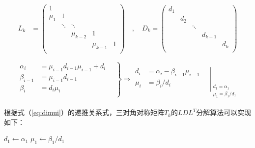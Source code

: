 \documentclass[UTF8,nofonts]{ctexart}
\begin{document}
\begin{equation*}
	\label{eq:lkdk}
	\begin{aligned}
		L_k &= \begin{pmatrix}
			1 & & & & \\
			\mu_1 & 1 & & & \\
			& \ddots & \ddots & & \\
			& & \mu_{k-2} & 1 & \\
			& & & \mu_{k-1} & 1 \\
		\end{pmatrix}\quad,\quad
		D_k = \begin{pmatrix}
			d_1 & & & & \\
			& d_2 & & & \\
			& & \ddots & & \\
			& & & d_{k-1} & \\
			& & & & d_k \\
		\end{pmatrix}
	\end{aligned}
\end{equation*}

\begin{equation}
	\label{eq:dimui}
	\left.
		\begin{aligned}
			\alpha_i &= \mu_{i-1}d_{i-1}\mu_{i-1}+d_i \\
			\beta_{i-1} &= \mu_{i-1}d_{i-1} \\
			\beta_i &= d_i\mu_i \\
		\end{aligned}\quad
	\right\}\Longrightarrow
	\left.
		\begin{aligned}
			d_i &= \alpha_i - \beta_{i-1}\mu_{i-1} \\
			\mu_i &= \beta_i / d_i \\
		\end{aligned}\quad
	\right|_{
		\substack{
			d_1 = \alpha_1 \\
			\mu_1 = \beta_1/d_1 \\
		}
	}
\end{equation}

根据式（\ref{eq:dimui}）的递推关系式，三对角对称矩阵$T_k$的$LDL^T$分解算法可以实现如下：

\begin{algorithm}[H]
	$d_1 \gets \alpha_1$\;
	$\mu_1 \gets \beta_1/d_1$\;
\end{algorithm}
\end{document}

